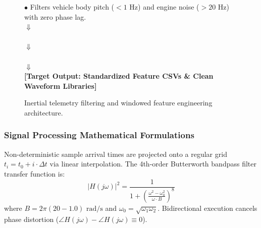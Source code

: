 \begin{figure}[htbp]
\begin{tcolorbox}[colback=gray!5,colframe=gray!50,arc=1mm,title=\textbf{Flowchart 2: Sensor Signal Processing and Windowing Pipeline}]
\begin{center}
{{$\bullet$ Filters vehicle body pitch ($<1\text{ Hz}$) and engine noise ($>20\text{ Hz}$) with zero phase lag.}} \\
$\Downarrow$ \\
 \\
$\Downarrow$ \\
 \\
$\Downarrow$ \\
\textbf{[Target Output: Standardized Feature CSVs \& Clean Waveform Libraries]}
\end{center}
\end{tcolorbox}
\caption{Inertial telemetry filtering and windowed feature engineering architecture.}
\label{fig:sensor_flowchart}
\end{figure}

\subsubsection{Signal Processing Mathematical Formulations}
Non-deterministic sample arrival times are projected onto a regular grid $t_i = t_0 + i \cdot \Delta t$ via linear interpolation. The 4th-order Butterworth bandpass filter transfer function is:
\begin{equation}
|H(j\omega)|^2 = \frac{1}{1 + \left(\frac{\omega^2 - \omega_0^2}{\omega \cdot B}\right)^8}
\end{equation}
where $B = 2\pi(20 - 1.0)\text{ rad/s}$ and $\omega_0 = \sqrt{\omega_1 \omega_2}$. Bidirectional execution cancels phase distortion ($\angle H(j\omega) - \angle H(j\omega) \equiv 0$).

